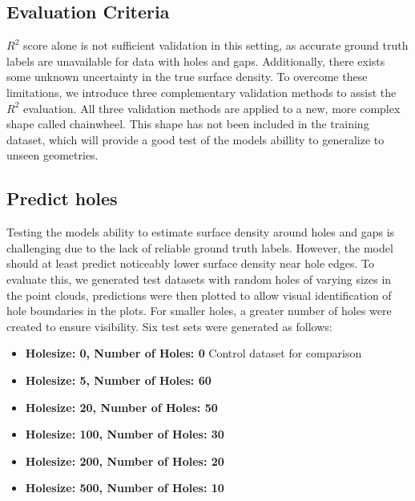 \subsection{Evaluation Criteria}
$R^2$ score alone is not sufficient validation in this setting, as accurate ground truth labels are unavailable for data with holes and gaps. Additionally, there exists some unknown uncertainty in the true surface density. To overcome these limitations, we introduce three complementary validation methods to assist the $R^2$ evaluation. All three validation methods are applied to a new, more complex shape called chainwheel. This shape has not been included in the training dataset, which will provide a good test of the models abillity to generalize to unseen geometries.

\subsection*{Predict holes}
Testing the models ability to estimate surface density around holes and gaps is challenging due to the lack of reliable ground truth labels. However, the model should at least predict noticeably lower surface density near hole edges. To evaluate this, we generated test datasets with random holes of varying sizes in the point clouds, predictions were then plotted to allow visual identification of hole boundaries in the plots. For smaller holes, a greater number of holes were created to ensure visibility. Six test sets were generated as follows:
\begin{itemize}
    \item \textbf{Holesize: 0, Number of Holes: 0} Control dataset for comparison
    \item \textbf{Holesize: 5, Number of Holes: 60}
    \item \textbf{Holesize: 20, Number of Holes: 50}
    \item \textbf{Holesize: 100, Number of Holes: 30}
    \item \textbf{Holesize: 200, Number of Holes: 20}
    \item \textbf{Holesize: 500, Number of Holes: 10}
\end{itemize}

